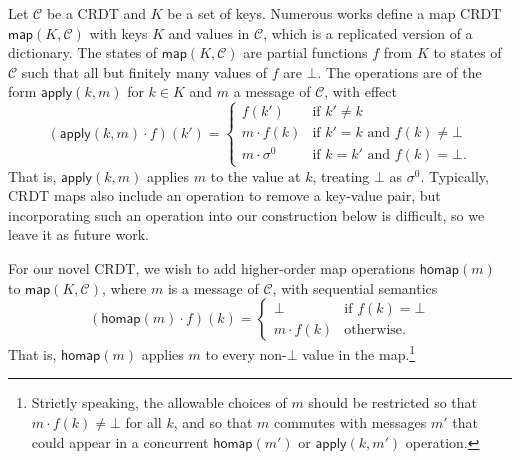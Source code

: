 \documentclass[acmsmall,nonacm,12pt]{acmart}
\newcommand{\mc}[1]{\ensuremath{\mathcal{#1}}}
\newcommand{\msf}[1]{\ensuremath{\mathsf{#1}}}
\theoremstyle{plain}
\theoremstyle{definition}
\begin{document}
Let $\mc{C}$ be a CRDT and $K$ be a set of keys.  Numerous works \cite{riak_datatypes, antidote, json} define a map CRDT $\msf{map}(K, \mc{C})$ with keys $K$ and values in $\mc{C}$, which is a replicated version of a dictionary. %
The states of $\msf{map}(K, \mc{C})$ are partial functions $f$ from $K$ to states of $\mc{C}$ such that all but finitely many values of $f$ are $\bot$.  The operations are of the form $\msf{apply}(k, m)$ for $k \in K$ and $m$ a message of $\mc{C}$, with effect
\[
(\msf{apply}(k, m) \cdot f)(k') = \begin{cases} f(k') &\mbox{if $k' \neq k$} \\ m \cdot f(k) &\mbox{if $k' = k$ and $f(k) \neq \bot$} \\ m \cdot \sigma^0 &\mbox{if $k = k'$ and $f(k) = \bot$.} \end{cases}
\]
That is, $\msf{apply}(k, m)$ applies $m$ to the value at $k$, treating $\bot$ as $\sigma^0$.  Typically, CRDT maps also include an operation to remove a key-value pair, but incorporating such an operation into our construction below is difficult, so we leave it as future work.  %

For our novel CRDT, we wish to add higher-order map operations $\msf{homap}(m)$ to $\msf{map}(K, \mc{C})$, where $m$ is a message of $\mc{C}$, with sequential semantics
\[
(\msf{homap}(m) \cdot f)(k) = \begin{cases} \bot &\mbox{if $f(k) = \bot$} \\ m \cdot f(k) &\mbox{otherwise.} \end{cases}
\]
That is, $\msf{homap}(m)$ applies $m$ to every non-$\bot$ value in the map.\footnote{Strictly speaking, the allowable choices of $m$ should be restricted so that $m \cdot f(k) \neq \bot$ for all $k$, and so that $m$ commutes with messages $m'$ that could appear in a concurrent $\msf{homap}(m')$ or $\msf{apply}(k, m')$ operation.}
\end{document}
